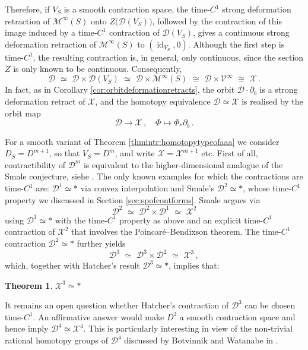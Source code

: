 \documentclass{amsart}
\newtheorem{thm}[prop]{Theorem}
\theoremstyle{definition}
\newcommand{\DD}{\mathcal D}
\newcommand{\MM}{\mathcal M}
\newcommand{\VV}{\mathcal V}
\newcommand{\XX}{\mathcal X}
\newcommand{\lra}{\longrightarrow}
\DeclareMathOperator{\id}{\mathrm{id}}
\begin{document}
Therefore,
if $V_S$ is a smooth contraction space,
the time-$C^1$ strong deformation retraction
of $\MM^{\infty}(S)$ onto
$Z\big(\DD(V_S)\big)$,
followed by the contraction of this image
induced by a time-$C^1$ contraction of $\DD(V_S)$,
gives a continuous strong deformation retraction
of $\MM^{\infty}(S)$ to $(\id_{V_S},0)$.
Although the first step is time-$C^1$,
the resulting contraction is, in general, only continuous,
since the section $Z$ is only known to be continuous.
Consequently,
\[
\DD
\,\,\simeq\,\,
\DD\times\DD(V_S)
\,\,\simeq\,\,
\DD\times\MM^{\infty}(S)
\,\,\cong\,\,
\DD\times\VV^{\infty}
\,\,\cong\,\,
\XX
\,.
\]
In fact, as in Corollary \ref{cor:orbitdeformationretracts},
the orbit $\DD\cdot\partial_b$
is a strong deformation retract of $\XX$,
and the homotopy equivalence
$\DD\simeq\XX$ is realised by the orbit map
\[
\DD\lra\XX
\,,
\quad
\Phi\longmapsto\Phi_*\partial_b
\,.
\]
  
For a smooth variant of Theorem \ref{thmintr:homotopytypeofaaa}
we consider $D_S=D^{m+1}$, so that $V_S=D^m$,
and write $\XX=\XX^{m+1}$ etc.
First of all,
contractibility of $\DD^m$ is equivalent
to the higher-dimensional analogue
of the Smale conjecture,
siehe \cite[Hülfssätze~1.2.2 und 2.1.2]{ev11}.
The only known examples
for which the contractions are time-$C^1$ are:
$\DD^1\simeq*$ via convex interpolation
and Smale's $\DD^2\simeq*$,
whose time-$C^1$ property we discussed in
Section \ref{sec:spofcontforms}.
Smale \cite{sm59} argues via
  \[
  \DD^2\,\,\simeq\,\,
  \DD^2\times\DD^1\,\,\simeq\,\,
  \XX^2
  \]
using $\DD^1\simeq*$ with the time-$C^1$
property as above
and an explicit time-$C^1$ contraction of $\XX^2$
that involves the Poincar\'e--Bendixson theorem.
The time-$C^1$ contraction $\DD^2\simeq*$
further yields
  \[
  \DD^3\,\,\simeq\,\,
  \DD^3\times\DD^2\,\,\simeq\,\,
  \XX^3
  \,,
  \]
which, together with Hatcher's \cite{hat83}
result $\DD^3\simeq*$, implies that:


\begin{thm}
\label{thm:homotopytypeofxx3}
$\XX^3\simeq*$
\end{thm}


It remains an open question whether
Hatcher's \cite{hat83} contraction of $\DD^3$
can be chosen time-$C^1$.
An affirmative answer would make $D^3$
a smooth contraction space and hence imply
$\DD^4\simeq\XX^4$.
This is particularly interesting in view of
the non-trivial rational homotopy groups of $\DD^4$
discussed by Botvinnik and Watanabe in \cite{bw23}.


\end{document}
